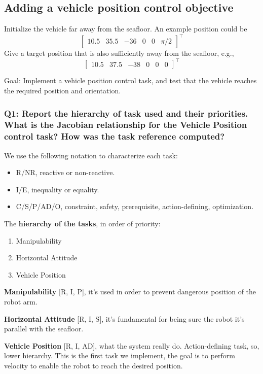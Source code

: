 \documentclass{article}
\begin{document}
\subsection{Adding a vehicle position control objective}
Initialize the vehicle far away from the seafloor. An example position could be
\begin{displaymath}
\begin{bmatrix} 10.5 & 35.5 & -36 & 0 & 0 & \pi/2\end{bmatrix}^\top
\end{displaymath} 
Give a target position that is also sufficiently away from the seafloor, e.g.,
\begin{displaymath}
\begin{bmatrix} 10.5 & 37.5 & -38 & 0 & 0 & 0 \end{bmatrix}^\top
\end{displaymath}

Goal: Implement a vehicle position control task, and test that the vehicle reaches the required position and orientation.



\subsubsection{Q1: Report the hierarchy of task used and their priorities. What is the Jacobian relationship for the Vehicle Position control task? How was the task reference computed?}

We use the following notation to characterize each task:
\begin{itemize}
    \item R/NR, reactive or non-reactive.
    \item I/E, inequality or equality.
    \item C/S/P/AD/O, constraint, safety, prerequisite, action-defining, optimization.
\end{itemize}

The \textbf{hierarchy of the tasks}, in order of priority:
\begin{enumerate}
    \item Manipulability 
    \item Horizontal Attitude
    \item Vehicle Position
\end{enumerate}

\begin{description}
	\item \textbf{Manipulability} [R, I, P], it's used in order to prevent dangerous position of the robot arm. 
	\item \textbf{Horizontal Attitude} [R, I, S], it's fundamental for being sure the robot it's parallel with the seafloor. 
	\item \textbf{Vehicle Position} [R, I, AD], what the system really do. Action-defining task, so, lower hierarchy. This is the first task we implement, the goal is to perform velocity to enable the robot to reach the desired position.
\end{description}
\end{document}
